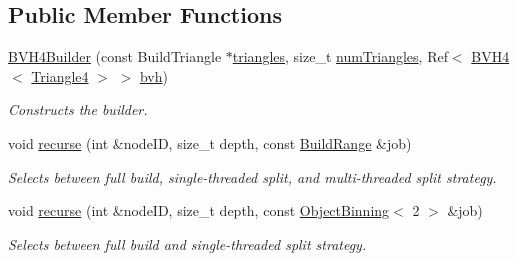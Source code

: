 \subsection*{Public Member Functions}
\begin{DoxyCompactItemize}
\item 
\hyperlink{classembree_1_1_b_v_h4_builder_a992103ac9c73bed5782474533b461095}{BVH4Builder} (const BuildTriangle $\ast$\hyperlink{classembree_1_1_b_v_h4_builder_af89f5d1b610f84ab13f6868b2b41e8c6}{triangles}, size\_\-t \hyperlink{classembree_1_1_b_v_h4_builder_a69ad7ed26f43d932fd56a32368cf2482}{numTriangles}, Ref$<$ \hyperlink{classembree_1_1_b_v_h4}{BVH4}$<$ \hyperlink{structembree_1_1_triangle4}{Triangle4} $>$ $>$ \hyperlink{classembree_1_1_b_v_h4_builder_aaf60392ce85c6554b4b58c5e001240f1}{bvh})
\begin{DoxyCompactList}\small\item\em Constructs the builder. \item\end{DoxyCompactList}\item 
void \hyperlink{classembree_1_1_b_v_h4_builder_a209fb5a8d996c0526a25d20d279c5951}{recurse} (int \&nodeID, size\_\-t depth, const \hyperlink{structembree_1_1_build_range}{BuildRange} \&job)
\begin{DoxyCompactList}\small\item\em Selects between full build, single-\/threaded split, and multi-\/threaded split strategy. \item\end{DoxyCompactList}\item 
void \hyperlink{classembree_1_1_b_v_h4_builder_a347a7d332ac2cbec22aaacd28e888ab1}{recurse} (int \&nodeID, size\_\-t depth, const \hyperlink{classembree_1_1_object_binning}{ObjectBinning}$<$ 2 $>$ \&job)
\begin{DoxyCompactList}\small\item\em Selects between full build and single-\/threaded split strategy. \item\end{DoxyCompactList}\end{DoxyCompactItemize}
